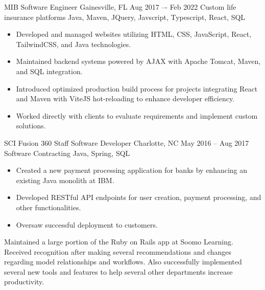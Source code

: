 \documentclass[10pt, a4paper]{cvhari}
\begin{document}
    \smallskip
    \divider
    \smallskip

    \company
        {MIB}
        {Software Engineer}
        {Gainesville, FL}
        {Aug 2017 –- Feb 2022}
        \project
            {Custom life insurance platforms}
            {Java, Maven, JQuery, Javscript, Typescript, React, SQL}
        
        \begin{itemize}
            \item Developed and managed websites utilizing HTML, CSS, JavaScript, React, TailwindCSS, and Java technologies.\smallskip
            \item Maintained backend systems powered by AJAX with Apache Tomcat, Maven, and SQL integration.\smallskip
            \item Introduced optimized production build process for projects integrating React and Maven with ViteJS hot-reloading to enhance developer efficiency.\smallskip
            \item Worked directly with clients to evaluate requirements and implement custom solutions.\smallskip
        \end{itemize}

    \smallskip
    \divider
    \smallskip

    \company
        {SCI Fusion 360}
        {Staff Software Developer}
        {Charlotte, NC}
        {May 2016 -- Aug 2017}
        \project
        {Software Contracting}
        {Java, Spring, SQL}
        
        \begin{itemize}
            \item Created a new payment processing application for banks by enhancing an existing Java monolith at IBM. \smallskip
            \item Developed RESTful API endpoints for user creation, payment processing, and other functionalities.\smallskip
            \item Oversaw successful deployment to customers.\smallskip
        \end{itemize}

\medskip

    \bigskip

    {Maintained a large portion of the Ruby on Rails app at Soomo Learning. Received recognition after making several recommendations and changes regarding model relationships and workflows. Also successfully implemented several new tools and features to help several other departments increase productivity.}\par
    \medskip
    
\end{document}
